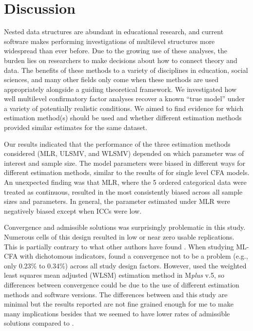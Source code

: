 \documentclass[Review,sageh,times, doublespace]{sagej}
\begin{document}
\section{Discussion}

Nested data structures are abundant in educational research, and current software makes performing investigations of multilevel structures more widespread than ever before.
Due to the growing use of these analyses, the burden lies on researchers to make decisions about how to connect theory and data.
The benefits of these methods to a variety of disciplines in education, social sciences, and many other fields only come when these methods are used appropriately alongside a guiding theoretical framework. 
We investigated how well multilevel confirmatory factor analyses recover a known ``true model'' under a variety of potentially realistic conditions.
We aimed to find evidence for which estimation method(s) should be used and whether different estimation methods provided similar estimates for the same dataset.

Our results indicated that the performance of the three estimation methods considered (MLR, ULSMV, and WLSMV) depended on which parameter was of interest and sample size.
The model parameters were biased in different ways for different estimation methods, similar to the results of \citep{DiStefano2014} for single level CFA models.
An unexpected finding was that MLR, where the 5 ordered categorical data were treated as continuous, resulted in the most consistently biased across all sample sizes and parameters.
In general, the parameter estimated under MLR were negatively biased except when ICCs were low.
	
Convergence and admissible solutions was surprisingly problematic in this study. 
Numerous cells of this design resulted in low or near zero usable replications. 
This is partially contrary to what other authors have found \citep{Hsu2009, Navruz2016}. 
When studying ML-CFA with dichotomous indicators, \cite[pg. 59]{Hsu2009} found a convergence not to be a problem  (e.g., only 0.23\% to 0.34\%) across all study design factors.
However, \cite{Hsu2009} used the weighted least squares mean adjusted (WLSM) estimation method in M\textit{plus} v.5, so differences between convergence could be due to the use of different estimation methods and software versions.
The differences between \cite{Navruz2016} and this study are minimal but the results reported are not fine grained enough for me to make many implications besides that we seemed to have lower rates of admissible solutions compared to \cite{Navruz2016}.
\end{document}
